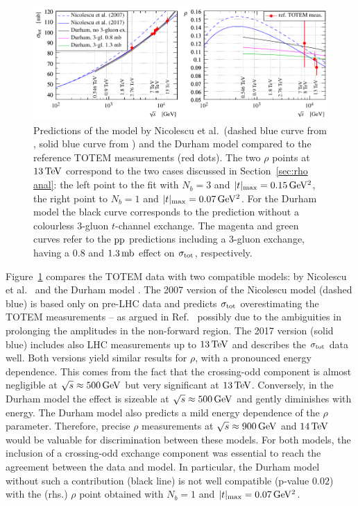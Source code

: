\begin{figure}
\vskip-5mm
\begin{center}
\includegraphics{fig/matching_models_si_tot_rho.pdf}
\caption{%
Predictions of the model by Nicolescu et al.~(dashed blue curve from \cite{nicolescu-2007}, solid blue curve from \cite{nicolescu-2017}) and the Durham model \cite{durham-2017-note} compared to the reference TOTEM measurements (red dots). The two $\rho$ points at $13\,{\rm TeV}$ correspond to the two cases discussed in Section~\ref{sec:rho anal}: the left point to the fit with $N_b=3$ and $|t|_{\rm max} = 0.15\,{\rm GeV^2}$, the right point to $N_b=1$ and $|t|_{\rm max} = 0.07\,{\rm GeV^2}$. For the Durham model the black curve corresponds to the prediction without a colourless 3-gluon $t$-channel exchange. The magenta and green curves refer to the $\rm pp$ predictions including a 3-gluon exchange, having a $0.8$ and $1.3\,{\rm mb}$ effect on $\sigma_{\rm tot}$, respectively.
}
\label{fig:match models}
\end{center}
\end{figure}

Figure~\ref{fig:match models} compares the TOTEM data with two compatible models: by Nicolescu et al.~\cite{nicolescu-2007,nicolescu-2017} and the Durham model \cite{durham-2017-note}. The 2007 version of the Nicolescu model (dashed blue) is based only on pre-LHC data and predicts $\sigma_{\rm tot}$ overestimating the TOTEM measurements -- as argued in Ref.~\cite{nicolescu-2017} possibly due to the ambiguities in prolonging the amplitudes in the non-forward region. The 2017 version (solid blue) includes also LHC measurements up to $13\,{\rm TeV}$ and describes the $\sigma_{\rm tot}$ data well. Both versions yield similar results for $\rho$, with a pronounced energy dependence. This comes from the fact that the crossing-odd component is almost negligible at $\sqrt s \approx 500\,{\rm GeV}$ but very significant at $13\,{\rm TeV}$. Conversely, in the Durham model the effect is sizeable at $\sqrt s \approx 500\,{\rm GeV}$ and gently diminishes with energy. The Durham model also predicts a mild energy dependence of the $\rho$ parameter. Therefore, precise $\rho$ measurements at $\sqrt s \approx 900\,{\rm GeV}$ and $14\,{\rm TeV}$ would be valuable for discrimination between these models. For both models, the inclusion of a crossing-odd exchange component was essential to reach the agreement between the data and model. In particular, the Durham model without such a contribution (black line) is not well compatible (p-value $0.02$) with the (rhs.) $\rho$ point obtained with $N_b=1$ and $|t|_{\rm max} = 0.07\,{\rm GeV^2}$.
